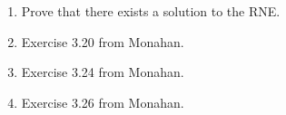 \documentclass[11pt]{article}
\begin{document}
\begin{enumerate}
\item Prove that there exists a solution to the RNE.

\item Exercise 3.20 from Monahan.

\item Exercise 3.24 from Monahan.

\item Exercise 3.26 from Monahan.



\end{enumerate}
\end{document}
